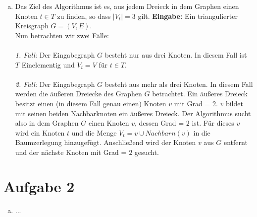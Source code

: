 \documentclass[12pt,a4paper]{article}
\begin{document}
\begin{enumerate}[a)]
	\item Das Ziel des Algorithmus ist es, aus jedem Dreieck in dem Graphen einen Knoten $t \in T$ zu finden, so dass $|V_t| = 3$ gilt. \textbf{Eingabe:} Ein triangulierter Kreisgraph $G=(V,E)$. \\
	Nun betrachten wir zwei Fälle: \\
	\\
	\textit{1. Fall:} Der Eingabegraph $G$ besteht nur aus drei Knoten. In diesem Fall ist $T$ Einelementig und $V_t=V$ für $t\in T$. \\
	\\
	\textit{2. Fall:} Der Eingabegraph $G$ besteht aus mehr als drei Knoten. In diesem Fall werden die äußeren Dreiecke des Graphen $G$ betrachtet. Ein äußeres Dreieck besitzt einen (in diesem Fall genau einen) Knoten $v$ mit Grad = 2. $v$ bildet mit seinen beiden Nachbarknoten ein äußeres Dreieck. Der Algorithmus sucht also in dem Graphen $G$ einen Knoten $v$, dessen Grad = $2$ ist. Für dieses $v$ wird ein Knoten $t$ und die Menge $V_t = {v} \cup {Nachbarn(v)}$ in die Baumzerlegung hinzugefügt. Anschließend wird der Knoten $v$ aus $G$ entfernt und der nächste Knoten mit Grad = $2$ gesucht.     
\end{enumerate}

\section*{Aufgabe 2}

\begin{enumerate}[a)] 
	
	\item ...
\end{enumerate} 
\end{document}
